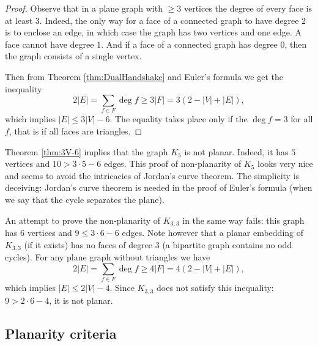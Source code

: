 \begin{page}
\setcounter{section}{3}
\setcounter{subsection}{3}
\setcounter{dfn}{9}
\label{portion:348}

\begin{proof}
Observe that in a plane graph with $\ge 3$ vertices the degree of every face is at least $3$.
Indeed, the only way for a face of a connected graph to have degree $2$ is to enclose an edge, in which case the graph has two vertices and one edge.
A face cannot have degree $1$. And if a face of a connected graph has degree $0$, then the graph consists of a single vertex.

Then from Theorem \ref{thm:DualHandshake} and Euler's formula we get the inequality
\[
2 |E| = \sum_{f \in F} \deg f \ge 3 |F| = 3 (2 - |V| + |E|),
\]
which implies $|E| \le 3|V| - 6$.
The equality takes place only if the $\deg f = 3$ for all $f$, that is if all faces are triangles.
\end{proof}

Theorem \ref{thm:3V-6} implies that the graph $K_5$ is not planar.
Indeed, it has $5$ vertices and $10 > 3\cdot 5 - 6$ edges.
This proof of non-planarity of $K_5$ looks very nice and seems to avoid the intricacies of Jordan's curve theorem.
The simplicity is deceiving: Jordan's curve theorem is needed in the proof of Euler's formula (when we say that the cycle separates the plane).

An attempt to prove the non-planarity of $K_{3,3}$ in the same way fails:
this graph has $6$ vertices and $9 \le 3 \cdot 6 - 6$ edges.
Note however that a planar embedding of $K_{3,3}$ (if it exists) has no faces of degree $3$ (a bipartite graph contains no odd cycles).
For any plane graph without triangles we have
\[
2 |E| = \sum_{f \in F} \deg f \ge 4 |F| = 4 (2 - |V| + |E|),
\]
which implies $|E| \le 2|V| - 4$.
Since $K_{3,3}$ does not satisfy this inequality: $9 > 2 \cdot 6 - 4$, it is not planar.





\end{page}

\begin{page}
\setcounter{section}{3}
\setcounter{subsection}{3}
\setcounter{dfn}{9}
\label{portion:350}

\subsection{Planarity criteria}

\end{page}


